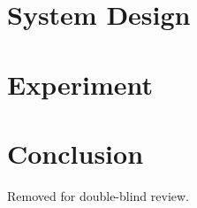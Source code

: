 \documentclass[sigconf]{acmart}
\begin{document}
\section{System Design}
	

\section{Experiment}
	

\section{Conclusion}
	

\begin{acks}
Removed for double-blind review.
\end{acks}




 
\end{document}
